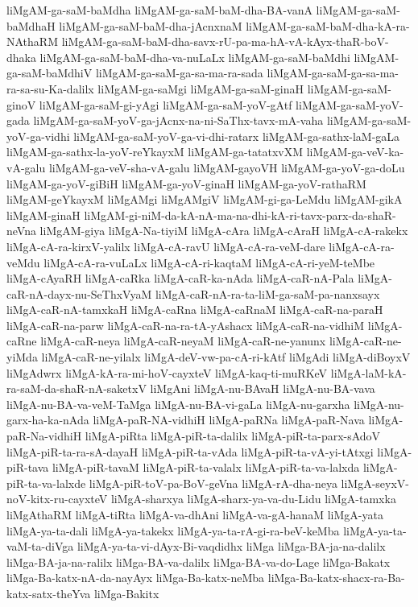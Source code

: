 {liMgAM-ga-saM-baMdha
liMgAM-ga-saM-baM-dha-BA-vanA
liMgAM-ga-saM-baMdhaH
liMgAM-ga-saM-baM-dha-jAcnxnaM
liMgAM-ga-saM-baM-dha-kA-ra-NAthaRM
liMgAM-ga-saM-baM-dha-savx-rU-pa-ma-hA-vA-kAyx-thaR-boV-dhaka
liMgAM-ga-saM-baM-dha-va-nuLaLx
liMgAM-ga-saM-baMdhi
liMgAM-ga-saM-baMdhiV
liMgAM-ga-saM-ga-sa-ma-ra-sada
liMgAM-ga-saM-ga-sa-ma-ra-sa-su-Ka-dalilx
liMgAM-ga-saMgi
liMgAM-ga-saM-ginaH
liMgAM-ga-saM-ginoV
liMgAM-ga-saM-gi-yAgi
liMgAM-ga-saM-yoV-gAtf
liMgAM-ga-saM-yoV-gada
liMgAM-ga-saM-yoV-ga-jAcnx-na-ni-SaThx-tavx-mA-vaha
liMgAM-ga-saM-yoV-ga-vidhi
liMgAM-ga-saM-yoV-ga-vi-dhi-ratarx
liMgAM-ga-sathx-laM-gaLa
liMgAM-ga-sathx-la-yoV-reYkayxM
liMgAM-ga-tatatxvXM
liMgAM-ga-veV-ka-vA-galu
liMgAM-ga-veV-sha-vA-galu
liMgAM-gayoVH
liMgAM-ga-yoV-ga-doLu
liMgAM-ga-yoV-giBiH
liMgAM-ga-yoV-ginaH
liMgAM-ga-yoV-rathaRM
liMgAM-geYkayxM
liMgAMgi
liMgAMgiV
liMgAM-gi-ga-LeMdu
liMgAM-gikA
liMgAM-ginaH
liMgAM-gi-niM-da-kA-nA-ma-na-dhi-kA-ri-tavx-parx-da-shaR-neVna
liMgAM-giya
liMgA-Na-tiyiM
liMgA-cAra
liMgA-cAraH
liMgA-cA-rakekx
liMgA-cA-ra-kirxV-yalilx
liMgA-cA-ravU
liMgA-cA-ra-veM-dare
liMgA-cA-ra-veMdu
liMgA-cA-ra-vuLaLx
liMgA-cA-ri-kaqtaM
liMgA-cA-ri-yeM-teMbe
liMgA-cAyaRH
liMgA-caRka
liMgA-caR-ka-nAda
liMgA-caR-nA-Pala
liMgA-caR-nA-dayx-nu-SeThxVyaM
liMgA-caR-nA-ra-ta-liM-ga-saM-pa-nanxsayx
liMgA-caR-nA-tamxkaH
liMgA-caRna
liMgA-caRnaM
liMgA-caR-na-paraH
liMgA-caR-na-parw
liMgA-caR-na-ra-tA-yAshacx
liMgA-caR-na-vidhiM
liMgA-caRne
liMgA-caR-neya
liMgA-caR-neyaM
liMgA-caR-ne-yanunx
liMgA-caR-ne-yiMda
liMgA-caR-ne-yilalx
liMgA-deV-vw-pa-cA-ri-kAtf
liMgAdi
liMgA-diBoyxV
liMgAdwrx
liMgA-kA-ra-mi-hoV-cayxteV
liMgA-kaq-ti-muRKeV
liMgA-laM-kA-ra-saM-da-shaR-nA-saketxV
liMgAni
liMgA-nu-BAvaH
liMgA-nu-BA-vava
liMgA-nu-BA-va-veM-TaMga
liMgA-nu-BA-vi-gaLa
liMgA-nu-garxha
liMgA-nu-garx-ha-ka-nAda
liMgA-paR-NA-vidhiH
liMgA-paRNa
liMgA-paR-Nava
liMgA-paR-Na-vidhiH
liMgA-piRta
liMgA-piR-ta-dalilx
liMgA-piR-ta-parx-sAdoV
liMgA-piR-ta-ra-sA-dayaH
liMgA-piR-ta-vAda
liMgA-piR-ta-vA-yi-tAtxgi
liMgA-piR-tava
liMgA-piR-tavaM
liMgA-piR-ta-valalx
liMgA-piR-ta-va-lalxda
liMgA-piR-ta-va-lalxde
liMgA-piR-toV-pa-BoV-geVna
liMgA-rA-dha-neya
liMgA-seyxV-noV-kitx-ru-cayxteV
liMgA-sharxya
liMgA-sharx-ya-va-du-Lidu
liMgA-tamxka
liMgAthaRM
liMgA-tiRta
liMgA-va-dhAni
liMgA-va-gA-hanaM
liMgA-yata
liMgA-ya-ta-dali
liMgA-ya-takekx
liMgA-ya-ta-rA-gi-ra-beV-keMba
liMgA-ya-ta-vaM-ta-diVga
liMgA-ya-ta-vi-dAyx-Bi-vaqdidhx
liMga
liMga-BA-ja-na-dalilx
liMga-BA-ja-na-ralilx
liMga-BA-va-dalilx
liMga-BA-va-do-Lage
liMga-Bakatx
liMga-Ba-katx-nA-da-nayAyx
liMga-Ba-katx-neMba
liMga-Ba-katx-shacx-ra-Ba-katx-satx-theYva
liMga-Bakitx
}
